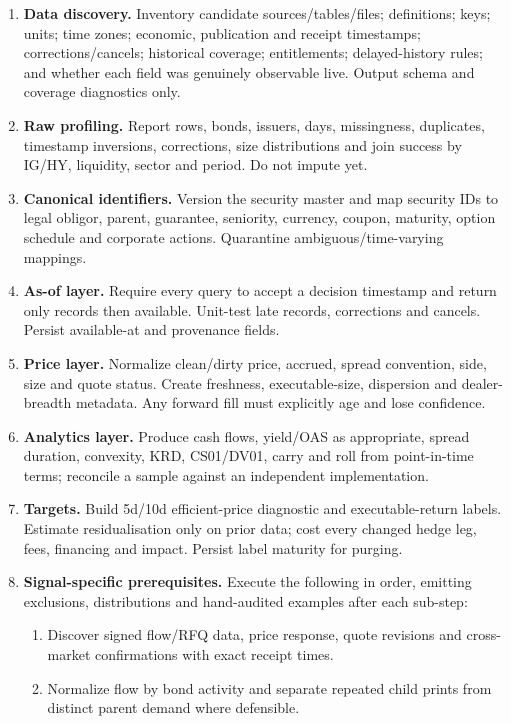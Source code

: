 \documentclass[10pt]{article}
\begin{document}
\begin{enumerate}[leftmargin=2em,label=\textbf{A\arabic*.}]
\item \textbf{Data discovery.} Inventory candidate sources/tables/files; definitions; keys; units; time zones; economic, publication and receipt timestamps; corrections/cancels; historical coverage; entitlements; delayed-history rules; and whether each field was genuinely observable live. Output schema and coverage diagnostics only.
\item \textbf{Raw profiling.} Report rows, bonds, issuers, days, missingness, duplicates, timestamp inversions, corrections, size distributions and join success by IG/HY, liquidity, sector and period. Do not impute yet.
\item \textbf{Canonical identifiers.} Version the security master and map security IDs to legal obligor, parent, guarantee, seniority, currency, coupon, maturity, option schedule and corporate actions. Quarantine ambiguous/time-varying mappings.
\item \textbf{As-of layer.} Require every query to accept a decision timestamp and return only records then available. Unit-test late records, corrections and cancels. Persist available-at and provenance fields.
\item \textbf{Price layer.} Normalize clean/dirty price, accrued, spread convention, side, size and quote status. Create freshness, executable-size, dispersion and dealer-breadth metadata. Any forward fill must explicitly age and lose confidence.
\item \textbf{Analytics layer.} Produce cash flows, yield/OAS as appropriate, spread duration, convexity, KRD, CS01/DV01, carry and roll from point-in-time terms; reconcile a sample against an independent implementation.
\item \textbf{Targets.} Build 5d/10d efficient-price diagnostic and executable-return labels. Estimate residualisation only on prior data; cost every changed hedge leg, fees, financing and impact. Persist label maturity for purging.
\item \textbf{Signal-specific prerequisites.} Execute the following in order, emitting exclusions, distributions and hand-audited examples after each sub-step:
\begin{enumerate}[label=\alph*)]
\item Discover signed flow/RFQ data, price response, quote revisions and cross-market confirmations with exact receipt times.
\item Normalize flow by bond activity and separate repeated child prints from distinct parent demand where defensible.

\end{enumerate}
\end{enumerate}
\end{document}
